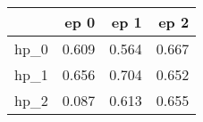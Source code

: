 \begin{tabular}{lrrr}
\toprule
{} &   ep 0 &   ep 1 &   ep 2 \\
\midrule
hp\_0 &  0.609 &  0.564 &  0.667 \\
hp\_1 &  0.656 &  0.704 &  0.652 \\
hp\_2 &  0.087 &  0.613 &  0.655 \\
\bottomrule
\end{tabular}
